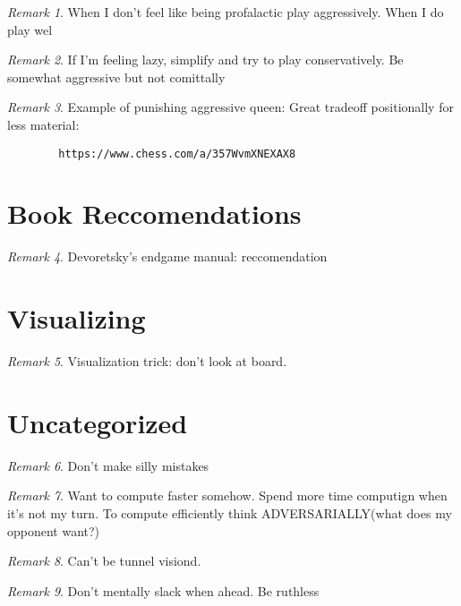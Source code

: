 \documentclass[11pt]{article}
\theoremstyle{remark}
\newtheorem{remark}{Remark}
\begin{document}
\begin{remark}
	When I don't feel like being profalactic play aggressively. When I do play wel
\end{remark}

\begin{remark}
	If I'm feeling lazy, simplify and try to play conservatively. Be somewhat aggressive but not comittally
\end{remark}

\begin{remark}
	Example of punishing aggressive queen: Great tradeoff positionally for less material: 
	\begin{verbatim}
		https://www.chess.com/a/357WvmXNEXAX8
	\end{verbatim}
\end{remark}

\section{Book Reccomendations}

\begin{remark}
	Devoretsky's endgame manual: reccomendation
\end{remark}

\section{Visualizing}

\begin{remark}
	Visualization trick: don't look at board.
\end{remark}

\section{Uncategorized}

\begin{remark}
	Don't make silly mistakes
\end{remark}

\begin{remark}
	Want to compute faster somehow. Spend more time computign when it's not my turn. To compute efficiently think ADVERSARIALLY(what does my opponent want?)
\end{remark}

\begin{remark}
	Can't be tunnel visiond.
\end{remark}

\begin{remark}
	Don't mentally slack when ahead. Be ruthless
\end{remark}
\end{document}
